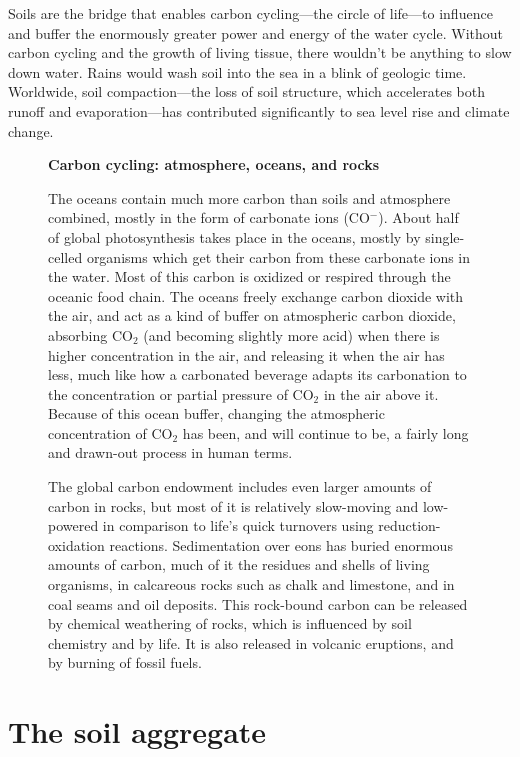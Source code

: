 \documentclass[11pt,letterpaper,twoside,onecolumn]{memoir}
\begin{document}
Soils are the bridge that enables carbon cycling---the circle of life---to influence and buffer the enormously greater power and energy of the water cycle. Without carbon cycling and the growth of living tissue, there wouldn't be anything to slow down water. Rains would wash soil into the sea in a blink of geologic time. Worldwide, soil compaction---the loss of soil structure, which accelerates both runoff and evaporation---has contributed significantly to sea level rise and climate change. 

\begin{figure}
\begin{tcolorbox}
\setlength{\parskip}{.7em}
\textbf{Carbon cycling: atmosphere, oceans, and rocks}

The oceans contain much more carbon than soils and atmosphere combined, mostly in the form of carbonate ions (CO$^-$). About half of global photosynthesis takes place in the oceans, mostly by single-celled organisms which get their carbon from these carbonate ions in the water. Most of this carbon is oxidized or respired through the oceanic food chain. The oceans freely exchange carbon dioxide with the air, and act as a kind of buffer on atmospheric carbon dioxide, absorbing CO$_{2}$ (and becoming slightly more acid) when there is higher concentration in the air, and releasing it when the air has less, much like how a carbonated beverage adapts its carbonation to the concentration or partial pressure of CO$_2$ in the air above it. Because of this ocean buffer, changing the atmospheric concentration of CO$_{2}$ has been, and will continue to be, a fairly long and drawn-out process in human terms.

The global carbon endowment includes even larger amounts of carbon in rocks, but most of it is relatively slow-moving and low-powered in comparison to life's quick turnovers using reduction-oxidation reactions. Sedimentation over eons has buried enormous amounts of carbon, much of it the residues and shells of living organisms, in calcareous rocks such as chalk and limestone, and in coal seams and oil deposits. This rock-bound carbon can be released by chemical weathering of rocks, which is influenced by soil chemistry and by life. It is also released in volcanic eruptions, and by burning of fossil fuels.

\end{tcolorbox}
\end{figure}

\section*{The soil aggregate}
\end{document}
